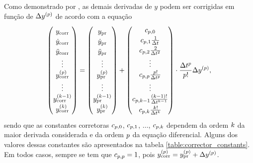 Como demonstrado por , as demais derivadas de \(y\) podem ser corrigidas em função de \(\Delta \deriv{\eqOrder}{y}\) de acordo com a equação
\begin{equation} \label{eq:correction}
	\def\arraystretch{1.2}
	\begin{pmatrix}
		\corrected{\deriv{0}{y}} \\
		\corrected{\deriv{1}{y}} \\
		\corrected{\deriv{2}{y}} \\
		\vdots \\
		\corrected{\deriv{\eqOrder}{y}} \\
		\vdots \\
		\corrected{\deriv{\taylorOrder-1}{y}} \\
		\corrected{\deriv{\taylorOrder}{y}}
	\end{pmatrix}
	=
	\begin{pmatrix}
		\predicted{\deriv{0}{y}} \\
		\predicted{\deriv{1}{y}} \\
		\predicted{\deriv{2}{y}} \\
		\vdots \\
		\predicted{\deriv{\eqOrder}{y}} \\
		\vdots \\
		\predicted{\deriv{\taylorOrder-1}{y}} \\
		\predicted{\deriv{\taylorOrder}{y}}
	\end{pmatrix}
	+
	\begin{pmatrix}
		\correctorConstant{0}{\eqOrder} \\
		\correctorConstant{1}{\eqOrder}\frac{1}{\Dt} \\
		\correctorConstant{2}{\eqOrder}\frac{2}{\Dt^2} \\
		\vdots \\
		\correctorConstant{\eqOrder}{\eqOrder}\frac{\eqOrder!}{\Dt^\eqOrder}\\
		\vdots \\
		\correctorConstant{\taylorOrder-1}{\eqOrder}\frac{\pqty{\taylorOrder-1}!}{\Dt^{\taylorOrder-1}}\\
		\correctorConstant{\taylorOrder}{\eqOrder}\frac{\taylorOrder!}{\Dt^\taylorOrder}
	\end{pmatrix}
	\cdot
	\dfrac{\Dt^\eqOrder}{\eqOrder!}\Delta \deriv{\eqOrder}{y},
\end{equation}
sendo que as constantes corretoras \(c_{p, 0}\), \(c_{p, 1}\), \(\dotsc\), \(c_{p, k}\) dependem da ordem \(k\) da maior derivada considerada e da ordem \(p\) da equação diferencial. Alguns dos valores dessas constantes são apresentados na tabela \ref{table:corrector_constants}. Em todos casos, sempre se tem que \(c_{p, p}=1\), pois \(\corrected{\deriv{p}{y}} = \predicted{\deriv{p}{y}} + \Delta \deriv{\eqOrder}{y}\).

